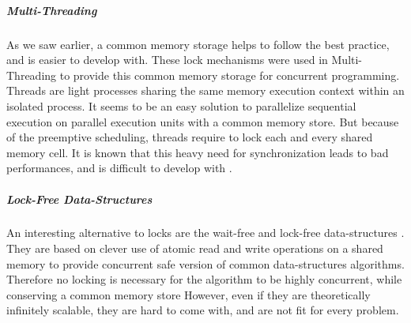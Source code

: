

\subparagraph{Multi-Threading}

As we saw earlier, a common memory storage helps to follow the best practice, and is easier to develop with.
These lock mechanisms were used in Multi-Threading to provide this common memory storage for concurrent programming.
Threads are light processes sharing the same memory execution context within an isolated process.
It seems to be an easy solution to parallelize sequential execution on parallel execution units with a common memory store.
But because of the preemptive scheduling, threads require to lock each and every shared memory cell.
It is known that this heavy need for synchronization leads to bad performances, and is difficult to develop with \cite{Adya2002}.

\subparagraph{Lock-Free Data-Structures}

An interesting alternative to locks are the wait-free and lock-free data-structures \cite{Lamport1977,Herlihy1988,Herlihy1990,Herlihy1991,Anderson1990}.
They are based on clever use of atomic read and write operations on a shared memory to provide concurrent safe version of common data-structures algorithms.
Therefore no locking is necessary for the algorithm to be highly concurrent, while conserving a common memory store
However, even if they are theoretically infinitely scalable, they are hard to come with, and are not fit for every problem.


